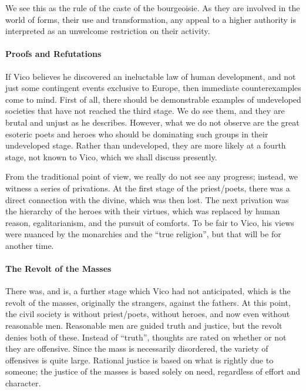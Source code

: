We see this as the rule of the caste of the bourgeoisie. As they are involved in the world of forms, their use and transformation, any appeal to a higher authority is interpreted as an unwelcome restriction on their activity.

\paragraph{Proofs and Refutations}


If Vico believes he discovered an ineluctable law of human development, and not just some contingent events exclusive to Europe, then immediate counterexamples come to mind. First of all, there should be demonstrable examples of undeveloped societies that have not reached the third stage. We do see them, and they are brutal and unjust as he describes. However, what we do not observe are the great esoteric poets and heroes who should be dominating such groups in their undeveloped stage. Rather than undeveloped, they are more likely at a fourth stage, not known to Vico, which we shall discuss presently.

From the traditional point of view, we really do not see any progress; instead, we witness a series of privations. At the first stage of the priest/poets, there was a direct connection with the divine, which was then lost. The next privation was the hierarchy of the heroes with their virtues, which was replaced by human reason, egalitarianism, and the pursuit of comforts. To be fair to Vico, his views were nuanced by the monarchies and the ``true religion'', but that will be for another time.

\paragraph{The Revolt of the Masses}


There was, and is, a further stage which Vico had not anticipated, which is the revolt of the masses, originally the strangers, against the fathers. At this point, the civil society is without priest/poets, without heroes, and now even without reasonable men. Reasonable men are guided truth and justice, but the revolt denies both of these. Instead of ``truth'', thoughts are rated on whether or not they are offensive. Since the mass is necessarily disordered, the variety of offensives is quite large. Rational justice is based on what is rightly due to someone; the justice of the masses is based solely on need, regardless of effort and character.

